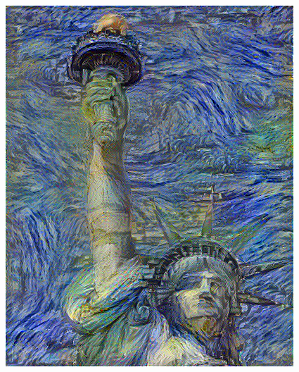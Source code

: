 \documentclass[11pt,class=report,crop=false]{standalone}
\begin{document}
\begin{center}
\includegraphics[scale=\myscale,scale=0.5]{figures/best_1000it_512px.png}
\end{center}
\end{document}
